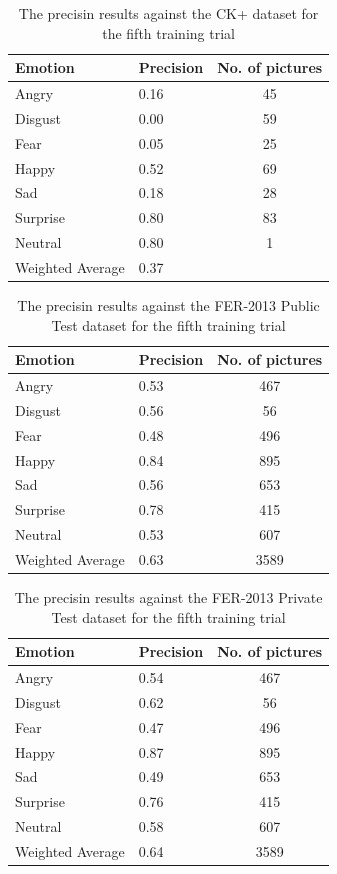 \documentclass[runningheads,a4paper,11pt]{report}
\begin{document}
\begin{table}[htbp]
	\caption{The precisin results against the CK+ dataset for the fifth training trial}
	\label{fer_training_28k_01_mean_square_ckp}
		\begin{center}
			\begin{tabular}{p{110pt}p{110pt}c}
				\textbf{Emotion}& \textbf{Precision}& \textbf{No. of pictures} \\
				\hline\hline
				Angry& 0.16& 45 \\
				Disgust& 0.00& 59 \\
				Fear& 0.05& 25 \\
				Happy& 0.52& 69 \\
				Sad& 0.18& 28 \\
				Surprise& 0.80& 83 \\
				Neutral& 0.80& 1 \\
				\hline
				Weighted Average& 0.37
			\end{tabular}
		\end{center}
\end{table}
\begin{table}[htbp]
	\caption{The precisin results against the FER-2013 Public Test dataset for the fifth training trial}
	\label{fer_training_28k_01_mean_square_public_test}
		\begin{center}
			\begin{tabular}{p{110pt}p{110pt}c}
				\textbf{Emotion}& \textbf{Precision}& \textbf{No. of pictures} \\
				\hline\hline
				Angry& 0.53& 467 \\
				Disgust& 0.56& 56 \\
				Fear& 0.48& 496 \\
				Happy& 0.84& 895 \\
				Sad& 0.56& 653 \\
				Surprise& 0.78& 415 \\
				Neutral& 0.53& 607 \\
				\hline
				Weighted Average& 0.63 &3589
			\end{tabular}
		\end{center}
\end{table}
\begin{table}[htbp]
	\caption{The precisin results against the FER-2013 Private Test dataset for the fifth training trial}
	\label{fer_training_28k_01_mean_square_private_test}
		\begin{center}
			\begin{tabular}{p{110pt}p{110pt}c}
				\textbf{Emotion}& \textbf{Precision}& \textbf{No. of pictures} \\
				\hline\hline
				Angry& 0.54& 467 \\
				Disgust& 0.62& 56 \\
				Fear& 0.47& 496 \\
				Happy& 0.87& 895 \\
				Sad& 0.49& 653 \\
				Surprise& 0.76& 415 \\
				Neutral& 0.58& 607 \\
				\hline
				Weighted Average& 0.64 &3589
			\end{tabular}
		\end{center}
\end{table}
\end{document}
